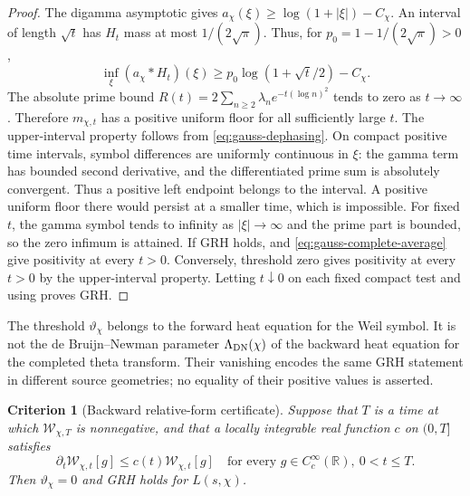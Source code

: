 \documentclass[11pt]{article}
\newtheorem{criterion}[theorem]{Criterion}
\theoremstyle{definition}
\theoremstyle{remark}
\newcommand{\R}{\mathbb R}
\begin{document}
\begin{proof}
The digamma asymptotic gives
$a_\chi(\xi)\ge\log(1+|\xi|)-C_\chi$.
An interval of length $\sqrt t$ has $H_t$ mass at most
$1/(2\sqrt\pi)$.  Thus, for $p_0=1-1/(2\sqrt\pi)>0$,
\begin{equation}
 \inf_\xi(a_\chi*H_t)(\xi)
 \ge p_0\log(1+\sqrt t/2)-C_\chi.
 \label{eq:gauss-large-time}
\end{equation}
The absolute prime bound
$R(t)=2\sum_{n\ge2}\lambda_ne^{-t(\log n)^2}$ tends to zero as
$t\to\infty$.  Therefore $m_{\chi,t}$ has a positive uniform floor
for all sufficiently large $t$.  The upper-interval property follows
from \eqref{eq:gauss-dephasing}.
On compact positive time intervals, symbol differences are uniformly
continuous in $\xi$: the gamma term has bounded second derivative,
and the differentiated prime sum is absolutely convergent.  Thus a
positive left endpoint belongs to the interval.  A positive uniform
floor there would persist at a smaller time, which is impossible.
For fixed $t$, the gamma symbol tends to infinity as $|\xi|\to\infty$
and the prime part is bounded, so the zero infimum is attained.
If GRH holds,  and
\eqref{eq:gauss-complete-average} give positivity at every $t>0$.
Conversely, threshold zero gives positivity at every $t>0$ by the
upper-interval property.  Letting $t\downarrow0$ on each fixed compact
test and using  proves GRH.
\end{proof}

The threshold $\vartheta_\chi$ belongs to the forward heat equation
for the Weil symbol.  It is not the de Bruijn--Newman parameter
$\Lambda_{\rm DN}(\chi)$ of the backward heat equation for the
completed theta transform.  Their vanishing encodes the same GRH
statement in different source geometries; no equality of their
positive values is asserted.

\begin{criterion}[Backward relative-form certificate]
\label{crit:gauss-relative-flow}
Suppose that $T$ is a time at which $\mathcal W_{\chi,T}$ is
nonnegative, and that a locally integrable real function $c$ on
$(0,T]$ satisfies
\begin{equation}
 \partial_t\mathcal W_{\chi,t}[g]
 \le c(t)\mathcal W_{\chi,t}[g]
 \quad\text{for every }g\in C_c^\infty(\R),\ 0<t\le T.
 \label{eq:gauss-relative-flow}
\end{equation}
Then $\vartheta_\chi=0$ and GRH holds for $L(s,\chi)$.
\end{criterion}
\end{document}
